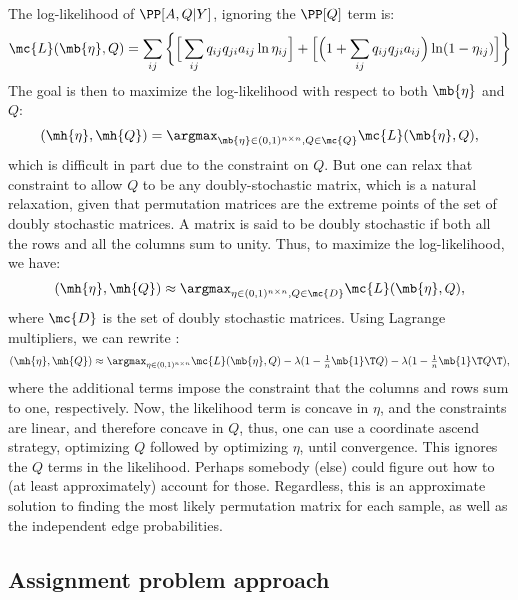The log-likelihood of $\PP[A,Q|Y]$, ignoring the $\PP[Q]$ term is:
\begin{align}
	\mc{L}(\mb{\eta},Q)  = \sum_{ij} \bigg\{\Big[\sum_{ij} q_{ij} q_{ji} a_{ij} \ln \eta_{ij}\Big] + \Big[ \Big(1+\sum_{ij} q_{ij} q_{ji} a_{ij}\Big) \ln (1-\eta_{ij})\Big]\bigg\}
\end{align}
The goal is then to maximize the log-likelihood with respect to both $\mb{\eta}$ and $Q$:
\begin{align}
	(\mh{\eta},\mh{Q}) = \argmax_{\mb{\eta} \in (0,1)^{n\times n} ,Q \in \mc{Q}} \mc{L}(\mb{\eta},Q),
\end{align}
which is difficult in part due to the constraint on $Q$.  But one can relax that constraint to allow $Q$ to be any doubly-stochastic matrix, which is a natural relaxation, given that permutation matrices are the extreme points of the set of doubly stochastic matrices.  A matrix is said to be doubly stochastic if both all the rows and all the columns sum to unity.  Thus, to maximize the log-likelihood, we have:
\begin{align}
	(\mh{\eta},\mh{Q}) \approx \argmax_{\eta \in  (0,1)^{n\times n}, Q \in \mc{D}} \mc{L}(\mb{\eta},Q),
\end{align}
where $\mc{D}$ is the set of doubly stochastic matrices.  Using Lagrange multipliers, we can rewrite \label{eq:mle}:
\begin{align}
	(\mh{\eta},\mh{Q}) \approx \argmax_{\eta \in  (0,1)^{n\times n}} \mc{L}(\mb{\eta},Q) - \lambda (1 - \tfrac{1}{n}\mb{1}\T Q) - \lambda (1 - \tfrac{1}{n}\mb{1}\T Q\T),
\end{align}
where the additional terms impose the constraint that the columns and rows sum to one, respectively.  Now, the likelihood term is concave in $\eta$, and the constraints are linear, and therefore concave in $Q$, thus, one can use a coordinate ascend strategy, optimizing $Q$ followed by optimizing $\eta$, until convergence. This ignores the $Q$ terms in the likelihood.  Perhaps somebody (else) could figure out how to (at least approximately) account for those.  Regardless, this is an approximate solution to finding the most likely permutation matrix for each sample, as well as the independent edge probabilities.   


\subsection{Assignment problem approach} %
\label{sub:graph_isomorphism_approach}



